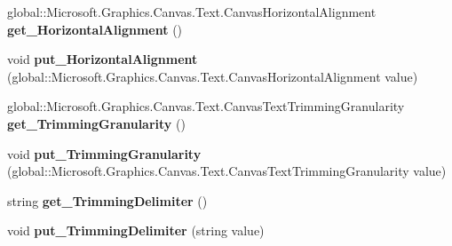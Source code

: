 \begin{DoxyCompactItemize}
\mbox{\label{class_microsoft_1_1_graphics_1_1_canvas_1_1_text_1_1_canvas_text_layout_a3b97a0cf1741dc7db0af0729a4a4fd99}} 
global\+::\+Microsoft.\+Graphics.\+Canvas.\+Text.\+Canvas\+Horizontal\+Alignment {\bfseries get\+\_\+\+Horizontal\+Alignment} ()
\item 
\mbox{\label{class_microsoft_1_1_graphics_1_1_canvas_1_1_text_1_1_canvas_text_layout_a58b83f1637a8f391083f54a8aa4458be}} 
void {\bfseries put\+\_\+\+Horizontal\+Alignment} (global\+::\+Microsoft.\+Graphics.\+Canvas.\+Text.\+Canvas\+Horizontal\+Alignment value)
\item 
\mbox{\label{class_microsoft_1_1_graphics_1_1_canvas_1_1_text_1_1_canvas_text_layout_a9102f8ce39e24dc440f8622fc04bab18}} 
global\+::\+Microsoft.\+Graphics.\+Canvas.\+Text.\+Canvas\+Text\+Trimming\+Granularity {\bfseries get\+\_\+\+Trimming\+Granularity} ()
\item 
\mbox{\label{class_microsoft_1_1_graphics_1_1_canvas_1_1_text_1_1_canvas_text_layout_a8bd75850c7ca9bc8d4e98c9d18e868de}} 
void {\bfseries put\+\_\+\+Trimming\+Granularity} (global\+::\+Microsoft.\+Graphics.\+Canvas.\+Text.\+Canvas\+Text\+Trimming\+Granularity value)
\item 
\mbox{\label{class_microsoft_1_1_graphics_1_1_canvas_1_1_text_1_1_canvas_text_layout_a6259a3e05a9e4d4bbd4106118e8704ac}} 
string {\bfseries get\+\_\+\+Trimming\+Delimiter} ()
\item 
\mbox{\label{class_microsoft_1_1_graphics_1_1_canvas_1_1_text_1_1_canvas_text_layout_ac3ad3931690e2ea00d327da3e7e7fb67}} 
void {\bfseries put\+\_\+\+Trimming\+Delimiter} (string value)
\item 
\mbox{\label{class_microsoft_1_1_graphics_1_1_canvas_1_1_text_1_1_canvas_text_layout_a7c0e59b2da1aae9111e5695f0d5eb187}} 

\end{DoxyCompactItemize}

